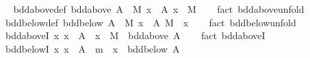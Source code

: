 \begin{isabellebody}
\isadelimproof
\ %
\endisadelimproof
%
\isatagproof
\isacommand{{\isachardot}{\kern0pt}{\isachardot}{\kern0pt}}\isamarkupfalse%
%
\endisatagproof
{\isafoldproof}%
%
\isadelimproof
%
\endisadelimproof
\isanewline
\isanewline
{}\isamarkupfalse%
\ bdd{\isacharunderscore}{\kern0pt}above{\isacharunderscore}{\kern0pt}def{\isacharcolon}{\kern0pt}\ {\isacartoucheopen}bdd{\isacharunderscore}{\kern0pt}above\ A\ {\isasymlongleftrightarrow}\ {\isacharparenleft}{\kern0pt}{\isasymexists}M{\isachardot}{\kern0pt}\ {\isasymforall}x\ {\isasymin}\ A{\isachardot}{\kern0pt}\ x\ {\isasymle}\ M{\isacharparenright}{\kern0pt}{\isacartoucheclose}\isanewline
%
\isadelimproof
\ \ %
\endisadelimproof
%
\isatagproof
{}\isamarkupfalse%
\ {\isacharparenleft}{\kern0pt}fact\ bdd{\isacharunderscore}{\kern0pt}above{\isachardot}{\kern0pt}unfold{\isacharparenright}{\kern0pt}%
\endisatagproof
{\isafoldproof}%
%
\isadelimproof
\isanewline
%
\endisadelimproof
\isanewline
{}\isamarkupfalse%
\ bdd{\isacharunderscore}{\kern0pt}below{\isacharunderscore}{\kern0pt}def{\isacharcolon}{\kern0pt}\ {\isacartoucheopen}bdd{\isacharunderscore}{\kern0pt}below\ A\ {\isasymlongleftrightarrow}\ {\isacharparenleft}{\kern0pt}{\isasymexists}M{\isachardot}{\kern0pt}\ {\isasymforall}x\ {\isasymin}\ A{\isachardot}{\kern0pt}\ M\ {\isasymle}\ x{\isacharparenright}{\kern0pt}{\isacartoucheclose}\isanewline
%
\isadelimproof
\ \ %
\endisadelimproof
%
\isatagproof
{}\isamarkupfalse%
\ {\isacharparenleft}{\kern0pt}fact\ bdd{\isacharunderscore}{\kern0pt}below{\isachardot}{\kern0pt}unfold{\isacharparenright}{\kern0pt}%
\endisatagproof
{\isafoldproof}%
%
\isadelimproof
\isanewline
%
\endisadelimproof
\isanewline
{}\isamarkupfalse%
\ bdd{\isacharunderscore}{\kern0pt}aboveI{\isacharcolon}{\kern0pt}\ {\isachardoublequoteopen}{\isacharparenleft}{\kern0pt}{\isasymAnd}x{\isachardot}{\kern0pt}\ x\ {\isasymin}\ A\ {\isasymLongrightarrow}\ x\ {\isasymle}\ M{\isacharparenright}{\kern0pt}\ {\isasymLongrightarrow}\ bdd{\isacharunderscore}{\kern0pt}above\ A{\isachardoublequoteclose}\isanewline
%
\isadelimproof
\ \ %
\endisadelimproof
%
\isatagproof
{}\isamarkupfalse%
\ {\isacharparenleft}{\kern0pt}fact\ bdd{\isacharunderscore}{\kern0pt}above{\isachardot}{\kern0pt}I{\isacharparenright}{\kern0pt}%
\endisatagproof
{\isafoldproof}%
%
\isadelimproof
\isanewline
%
\endisadelimproof
\isanewline
{}\isamarkupfalse%
\ bdd{\isacharunderscore}{\kern0pt}belowI{\isacharcolon}{\kern0pt}\ {\isachardoublequoteopen}{\isacharparenleft}{\kern0pt}{\isasymAnd}x{\isachardot}{\kern0pt}\ x\ {\isasymin}\ A\ {\isasymLongrightarrow}\ m\ {\isasymle}\ x{\isacharparenright}{\kern0pt}\ {\isasymLongrightarrow}\ bdd{\isacharunderscore}{\kern0pt}below\ A{\isachardoublequoteclose}\isanewline

\end{isabellebody}
